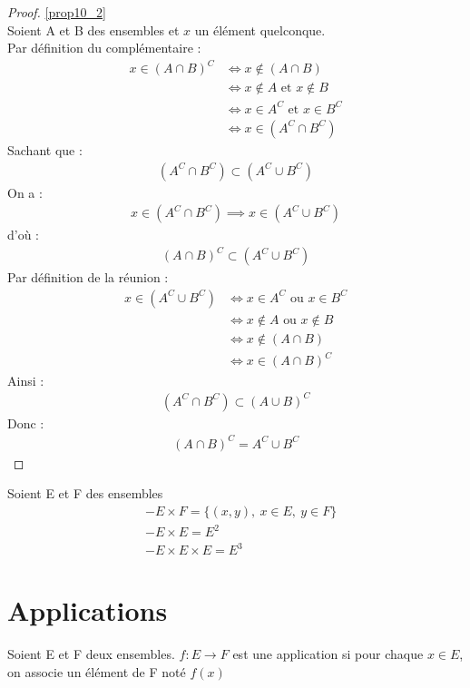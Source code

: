 \begin{proof}
	\ref{prop10_2} 
	\\
	Soient A et B des ensembles et $x$ un élément quelconque. \\
	\framebox{$\subset$} Par définition du complémentaire :
	\begin{align*}
		x \in (A \cap B)^C &\iff x \notin (A \cap B) \\ 
		&\iff x \notin A \text{ et } x \notin B \\
		&\iff x \in A^C \text{ et } x \in B^C \\
		&\iff x \in (A^C \cap B^C)
	\end{align*}
	Sachant que :
	\begin{align*}
		(A^C \cap B^C) \subset (A^C \cup B^C)
	\end{align*}
	On a :
	\begin{align*}
		x \in (A^C \cap B^C) \implies x \in (A^C \cup B^C)
	\end{align*}
	d'où :
	\begin{align*}
		(A \cap B)^C \subset (A^C \cup B^C)
	\end{align*}
	\framebox{$\supset$} Par définition de la réunion :
	\begin{align*}
		x \in (A^C \cup B^C) &\iff x \in A^C \text{ ou } x \in B^C \\
		&\iff x \notin A \text{ ou } x \notin B \\
		&\iff x \notin (A \cap B) \\
		&\iff x \in (A \cap B)^C
	\end{align*}
	Ainsi : 
	\begin{align*}
		(A^C \cap B^C) \subset (A \cup B)^C
	\end{align*}
	Donc :
	\begin{align*}
		(A \cap B)^C = A^C \cup B^C
	\end{align*}
\end{proof}

\begin{definition}
	Soient E et F des ensembles
	\begin{align*}
		&- E \times F = \{(x, y),\ x \in E,\ y \in F\} \\
		&- E \times E = E^2 \\
		&- E \times E \times E = E^3
	\end{align*}
\end{definition}

\section{Applications}
\begin{definition}[Application]
	Soient E et F deux ensembles. $f:E \to F$ est une application si pour chaque $x \in E$, on associe un élément de F noté $f(x)$
\end{definition}

